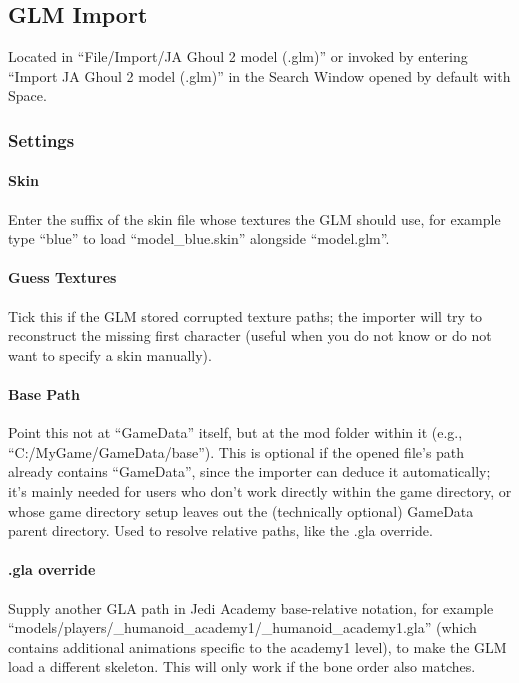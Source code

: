 \documentclass[a4paper,10pt]{article}
\begin{document}
 
 \subsection{GLM Import}
 
 Located in ``File/Import/JA Ghoul 2 model (.glm)'' or invoked by entering ``Import JA Ghoul 2 model (.glm)''
 in the Search Window opened by default with Space.
 
 \subsubsection*{Settings}
 
\paragraph*{Skin}
Enter the suffix of the skin file whose textures the GLM should use, for example type ``blue'' to load
``model\_blue.skin'' alongside ``model.glm''.

\paragraph*{Guess Textures}
Tick this if the GLM stored corrupted texture paths; the importer will try to reconstruct the missing first
character (useful when you do not know or do not want to specify a skin manually).

\paragraph*{Base Path}
Point this not at ``GameData'' itself, but at the mod folder within it (e.g., ``C:/MyGame/GameData/base''). This is
optional if the opened file's path already contains ``GameData'', since the importer can deduce it automatically;
it's mainly needed for users who don't work directly within the game directory, or whose game directory setup
leaves out the (technically optional) GameData parent directory. Used to resolve relative paths, like the .gla override.

\paragraph*{.gla override}
Supply another GLA path in Jedi Academy base-relative notation, for example
``models/players/\_humanoid\_academy1/\_humanoid\_academy1.gla'' (which contains additional animations specific
to the academy1 level), to make the GLM load a different skeleton. This will only work if the bone order also
matches.
\end{document}
